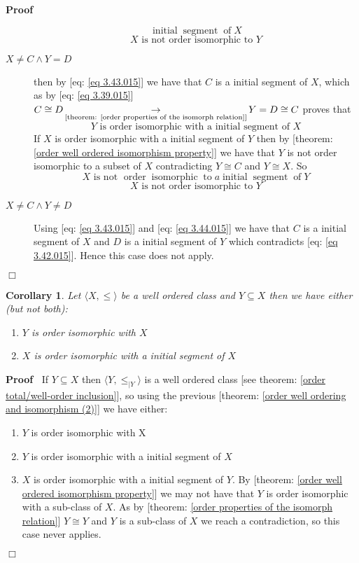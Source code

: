 \documentclass{book}
\newcommand{\Rightarrowlim}{\mathop{\rightarrow}\limits}
\newcommand{\tmop}[1]{\ensuremath{\operatorname{#1}}}
\newenvironment{proof}{\noindent\textbf{Proof\ }}{\hspace*{\fill}$\Box$\medskip}
\newtheorem{corollary}{Corollary}
\begin{document}
\begin{proof}
\begin{description}
\[       \tmop{initial} \tmop{segment} \tmop{of} X \]
    \[ X \text{ is not order isomorphic to } Y \]
    \item[$X \neq C \wedge Y = D$] then by [eq: \ref{eq 3.43.015}] we have
    that $C$ is a initial segment of $X$, which as by [eq: \ref{eq 3.39.015}]
    $C \cong D \Rightarrowlim_{\text{[theorem: \ref{order properties of the
    isomorph relation}]}} Y = D \cong C$ proves that
    \[ Y \text{ is order isomorphic with a initial segment of $X$} \]
    If $X$ is order isomorphic with a initial segment of $Y$ then by [theorem:
    \ref{order well ordered isomorphism property}] we have that $Y$ is not
    order isomorphic to a subset of $X$ contradicting $Y \cong C$ and $Y \cong
    X$. So \
    \[ X \text{ is not } \tmop{order} \tmop{isomorphic} \tmop{to} a
       \tmop{initial} \tmop{segment} \tmop{of} Y \]
    \[ X \text{ is not order isomorphic to } Y \]
    \item[$X \neq C \wedge Y \neq D$] Using [eq: \ref{eq 3.43.015}] and [eq:
    \ref{eq 3.44.015}] we have that $C$ is a initial segment of $X$ and $D$ is
    a initial segment of $Y$ which contradicts [eq: \ref{eq 3.42.015}]. Hence
    this case does not apply.
  \end{description}
\end{proof}

\begin{corollary}
  \label{order well order every subclass is isomorphic with A or a iitial
  segement}Let $\langle X, \leqslant \rangle$ be a well ordered class and $Y
  \subseteq X$ then we have either (but not both):
  \begin{enumerate}
    \item $Y$ is order isomorphic with $X$
    
    \item $X$ is order isomorphic with a initial segment of $X$
  \end{enumerate}
\end{corollary}

\begin{proof}
  If $Y \subseteq X$ then $\langle Y, \leqslant_{|Y} \rangle$ is a well
  ordered class [see theorem: \ref{order total/well-order inclusion}], so
  using the previous [theorem: \ref{order well ordering and isomorphism (2)}]
  we have either:
  \begin{enumerate}
    \item $Y$ is order isomorphic with X
    
    \item $Y$ is order isomorphic with a initial segment of $X$
    
    \item $X$ is order isomorphic with a initial segment of $Y$. By [theorem:
    \ref{order well ordered isomorphism property}] we may not have that $Y$ is
    order isomorphic with a sub-class of $X$. As by [theorem: \ref{order
    properties of the isomorph relation}] $Y \cong Y$ and $Y$ is a sub-class
    of $X$ we reach a contradiction, so this case never applies.
  \end{enumerate}
\end{proof}
\end{document}

